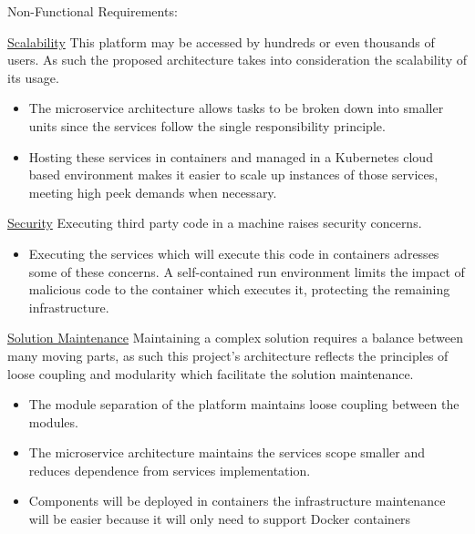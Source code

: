 \begin{flushleft}
Non-Functional Requirements:
\end{flushleft}

\begin{description}[font=$\bullet$~\normalfont\scshape\color{red!50!black}]
\item \underline{Scalability} This platform may be accessed by hundreds or even thousands of users. As such the proposed architecture takes into consideration the scalability of its usage.
	\begin{itemize}
		\item The microservice architecture allows tasks to be broken down into smaller units since the services follow the single responsibility principle.
		\item Hosting these services in containers and managed in a Kubernetes cloud based environment makes it easier to scale up instances of those services, meeting high peek demands when necessary.
	\end{itemize}
         
\item \underline{Security} Executing third party code in a machine raises security concerns.
	\begin{itemize}
		\item Executing the services which will execute this code in containers adresses some of these concerns. A self-contained run environment limits the impact of malicious code to the container which executes it, protecting the remaining infrastructure.
	\end{itemize}	   
              
\item \underline{Solution Maintenance}     
        Maintaining a complex solution requires a balance between many moving parts, as such this project's architecture reflects the principles of loose coupling and modularity which facilitate the solution maintenance. 
		\begin{itemize}
			\item The module separation of the platform maintains loose coupling between the modules.
			\item The microservice architecture maintains the services scope smaller and reduces dependence from services implementation.
			\item Components will be deployed in containers the infrastructure maintenance will be easier because it will only need to support Docker containers
		\end{itemize}		        


\end{description}

